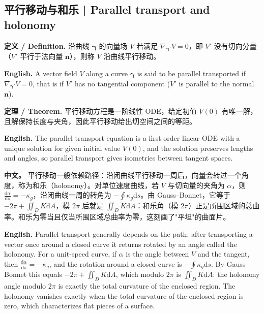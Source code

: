 \documentclass[UTF8,11pt,a4paper]{ctexart}
\newcommand{\APS}[2]{\par\noindent\textbf{中文。} #1\par\noindent\textbf{English.} #2\par\smallskip}
\newcommand{\EN}[1]{\par\noindent \textbf{English.} #1\par}
\newcommand{\DEF}[2]{\par\noindent\textbf{定义 / Definition.} #1\par\EN{#2}\par\smallskip}
\newcommand{\THM}[2]{\par\noindent\textbf{定理 / Theorem.} #1\par\EN{#2}\par\smallskip}
\newcommand{\dd}{\mathrm{d}}
\newcommand{\bn}{\mathbf{n}}
\newcommand{\bgamma}{\boldsymbol{\gamma}}
\begin{document}
\subsection{平行移动与和乐 | Parallel transport and holonomy}
\DEF{沿曲线 $\bgamma$ 的向量场 $V$ 若满足 $\nabla_{\bgamma'}V=0$，即 $V'$ 没有切向分量（$V'$ 平行于法向量 $\bn$），则称 $V$ 沿曲线平行移动。}{A vector field $V$ along a curve $\bgamma$ is said to be parallel transported if $\nabla_{\bgamma'}V=0$, that is if $V'$ has no tangential component ($V'$ is parallel to the normal $\bn$).}
\THM{平行移动方程是一阶线性 ODE，给定初值 $V(0)$ 有唯一解，且解保持长度与夹角，因此平行移动给出切空间之间的等距。}{The parallel transport equation is a first-order linear ODE with a unique solution for given initial value $V(0)$, and the solution preserves lengths and angles, so parallel transport gives isometries between tangent spaces.}
\APS{平行移动一般依赖路径：沿闭曲线平行移动一周后，向量会转过一个角度，称为和乐（holonomy）。对单位速度曲线，若 $V$ 与切向量的夹角为 $\alpha$，则 $\frac{\dd\alpha}{\dd s}=-\kappa_g$，沿闭曲线一周的转角为 $-\oint\kappa_g\dd s$。由 Gauss--Bonnet，它等于 $-2\pi+\iint_DK\dd A$，模 $2\pi$ 后就是 $\iint_DK\dd A$：和乐角（模 $2\pi$）正是所围区域的总曲率。和乐为零当且仅当所围区域总曲率为零，这刻画了"平坦"的曲面片。}{Parallel transport generally depends on the path: after transporting a vector once around a closed curve it returns rotated by an angle called the holonomy. For a unit-speed curve, if $\alpha$ is the angle between $V$ and the tangent, then $\frac{\dd\alpha}{\dd s}=-\kappa_g$, and the rotation around a closed curve is $-\oint\kappa_g\dd s$. By Gauss--Bonnet this equals $-2\pi+\iint_DK\dd A$, which modulo $2\pi$ is $\iint_DK\dd A$: the holonomy angle modulo $2\pi$ is exactly the total curvature of the enclosed region. The holonomy vanishes exactly when the total curvature of the enclosed region is zero, which characterizes flat pieces of a surface.}
\end{document}
